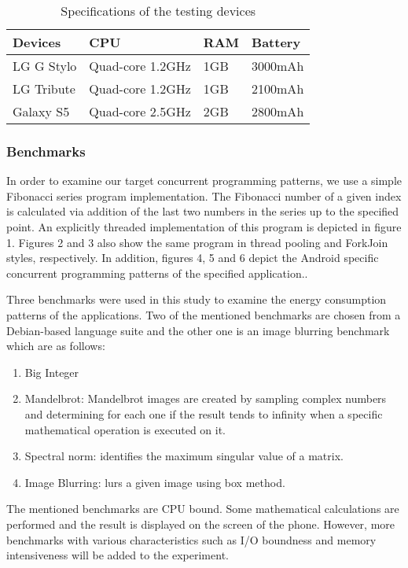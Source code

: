 \documentclass[conference,10pt]{IEEEtran}
\begin{document}
\begin{table}[h]
\caption{Specifications of the testing devices}
\label{table:devices}
\centering \small
\begin{tabular}{| l | l | l | l |}
    \hline
    \textbf{Devices} & \textbf{CPU} & \textbf{RAM} & \textbf{Battery} \\ \hline \hline
    LG G Stylo & Quad-core 1.2GHz & 1GB & 3000mAh\\ \hline
		LG Tribute & Quad-core 1.2GHz & 1GB & 2100mAh\\ \hline
		Galaxy S5 & Quad-core 2.5GHz & 2GB & 2800mAh\\ \hline		
\end{tabular}
\end{table}


\subsubsection{Benchmarks}


In order to examine our target concurrent programming patterns, we use a simple Fibonacci series program implementation. The Fibonacci number of a given index is calculated via addition of the last two numbers in the series up to the specified point. An explicitly threaded implementation of this program is depicted in figure 1. Figures 2 and 3 also show the same program in thread pooling and ForkJoin styles, respectively. In addition, figures 4, 5 and 6 depict the Android specific concurrent programming patterns of the specified application..

Three benchmarks were used in this study to examine the energy consumption patterns of the applications. Two of the mentioned benchmarks are chosen from a Debian-based language suite and the other one is an image blurring benchmark which are as follows:

\begin{enumerate}
	\item Big Integer
	\item Mandelbrot: Mandelbrot images are created by sampling complex numbers and determining for each one if the result tends to infinity when a specific mathematical operation is executed on it.
	\item Spectral norm: identifies the maximum singular value of a matrix.
	\item Image Blurring: lurs a given image using box method.
\end{enumerate}
The mentioned benchmarks are CPU bound. Some mathematical calculations are performed and the result is displayed on the screen of the phone. However, more benchmarks with various characteristics such as I/O boundness and memory intensiveness will be added to the experiment.
\end{document}
